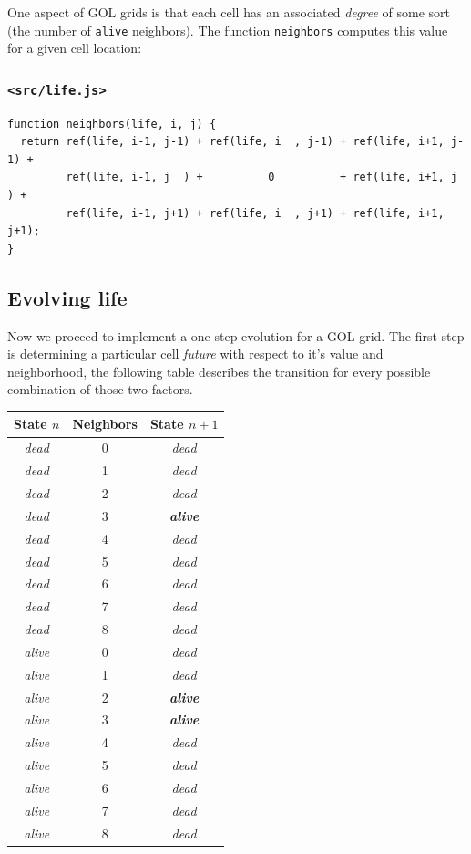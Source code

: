 \documentclass[11pt]{article}
\begin{document}
One aspect of GOL grids is that each cell has an associated \emph{degree} of some sort (the number of \texttt{alive} neighbors). The function \texttt{neighbors} computes this value for a given cell location:

\subsubsection*{\texttt{<src/life.js>}}
\label{sec:org079fa99}
\begin{verbatim}
function neighbors(life, i, j) {
  return ref(life, i-1, j-1) + ref(life, i  , j-1) + ref(life, i+1, j-1) +
         ref(life, i-1, j  ) +          0          + ref(life, i+1, j  ) +
         ref(life, i-1, j+1) + ref(life, i  , j+1) + ref(life, i+1, j+1);
}
\end{verbatim}

\subsection{Evolving life}
\label{sec:org693073d}

Now we proceed to implement a one-step evolution for a GOL grid. The first step is determining a particular cell \emph{future} with respect to it's value and neighborhood, the following table describes the transition for every possible combination of those two factors.

\begin{center}
\label{tab:orge96af64}
\begin{tabular}{ccc}
State \(n\) & Neighbors & State \(n+1\)\\
\hline
\emph{dead} & 0 & \emph{dead}\\
\emph{dead} & 1 & \emph{dead}\\
\emph{dead} & 2 & \emph{dead}\\
\emph{dead} & 3 & \emph{\textbf{alive}}\\
\emph{dead} & 4 & \emph{dead}\\
\emph{dead} & 5 & \emph{dead}\\
\emph{dead} & 6 & \emph{dead}\\
\emph{dead} & 7 & \emph{dead}\\
\emph{dead} & 8 & \emph{dead}\\
\emph{alive} & 0 & \emph{dead}\\
\emph{alive} & 1 & \emph{dead}\\
\emph{alive} & 2 & \emph{\textbf{alive}}\\
\emph{alive} & 3 & \emph{\textbf{alive}}\\
\emph{alive} & 4 & \emph{dead}\\
\emph{alive} & 5 & \emph{dead}\\
\emph{alive} & 6 & \emph{dead}\\
\emph{alive} & 7 & \emph{dead}\\
\emph{alive} & 8 & \emph{dead}\\
\end{tabular}
\end{center}
\end{document}
